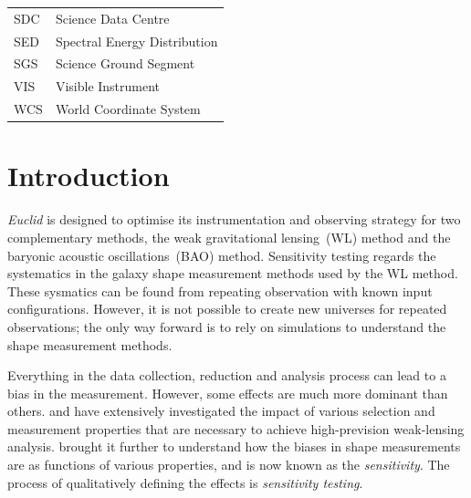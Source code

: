 \documentclass[11pt]{EuclidVIS}
\numberwithin{table}{section}
\numberwithin{figure}{section}
\begin{document}
\begin{tabular}{l l}
SDC & Science Data Centre \\
SED & Spectral Energy Distribution \\
SGS & Science Ground Segment \\
VIS & Visible Instrument \\
WCS & World Coordinate System \\
\end{tabular}


\newpage

\section{Introduction}
\textit{Euclid} is designed to optimise its instrumentation and observing strategy for two
complementary methods, the weak gravitational lensing~(WL) method and the baryonic acoustic
oscillations~(BAO) method. Sensitivity testing regards the systematics in the galaxy shape
measurement methods used by the WL method. These sysmatics can be found from repeating observation
with known input configurations. However, it is not possible to create new universes for
repeated observations; the only way forward is to rely on simulations to understand the shape
measurement methods.

Everything in the data collection, reduction and analysis process can lead to a bias in the
measurement. However, some effects are much more dominant than others. \cite{2007MNRAS.376...13M}
and \cite{2013MNRAS.431.3103C} have extensively investigated the impact of various selection and
measurement properties that are necessary to achieve high-prevision weak-lensing analysis.
\cite{2017MNRAS.467.1627F} brought it further to understand how the biases in shape measurements
are as functions of various properties, and is now known as the \textit{sensitivity}. The process
of qualitatively defining the effects is \textit{sensitivity testing}.
\end{document}
